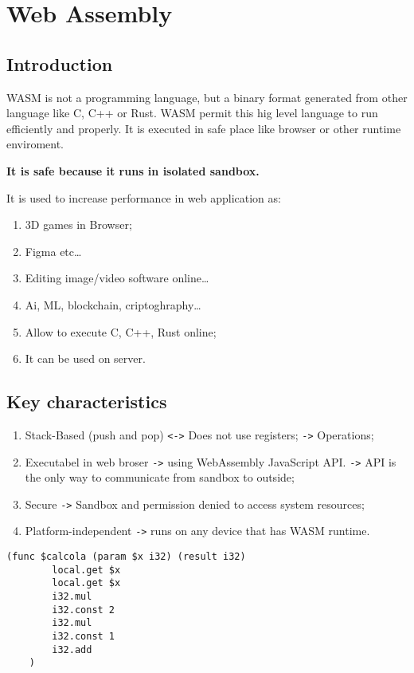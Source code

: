 \section{Web Assembly}

\subsection{Introduction}

WASM is not a programming language, but a binary format generated from other language like C, C++ or Rust. 
WASM permit this hig level language to run efficiently and properly.
It is executed in safe place like browser or other runtime enviroment.

\textbf{It is safe because it runs in isolated sandbox.}

It is used to increase performance in web application as: 
\begin{enumerate}
    \item 3D games in Browser; 
    \item Figma etc\dots
    \item Editing image/video software online\dots
    \item Ai, ML, blockchain, criptoghraphy\dots
    \item Allow to execute C, C++, Rust online;
    \item It can be used on server.
\end{enumerate}

\subsection{Key characteristics}

\begin{enumerate}
    \item Stack-Based (push and pop) \texttt{<->} Does not use registers; \texttt{->} Operations;
    \item Executabel in web broser \texttt{->} using WebAssembly JavaScript API. \texttt{->} API is the only way to communicate from sandbox to outside;
    \item Secure \texttt{->} Sandbox and permission denied to access system resources;
    \item Platform-independent \texttt{->} runs on any device that has WASM runtime.
\end{enumerate}

\begin{lstlisting}[language=wat]
    (func $calcola (param $x i32) (result i32)
        local.get $x
        local.get $x
        i32.mul
        i32.const 2
        i32.mul
        i32.const 1
        i32.add
    )
    \end{lstlisting}

